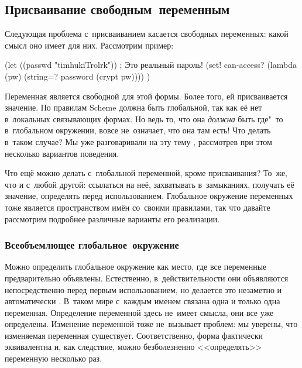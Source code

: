 \subsection{Присваивание свободным~переменным}%
\label{assignment/assignment/ssect:free-vars}

Следующая проблема с~присваиванием касается свободных переменных: какой смысл
оно имеет для них. Рассмотрим пример:

\begin{code:lisp}
(let ((passwd "timhukiTrolrk"))  ; Это реальный пароль!
  (set! can-access? (lambda (pw) (string=? password (crypt pw)))) )
\end{code:lisp}

Переменная  является свободной для этой формы. Более того, ей
присваивается значение. По правилам Scheme  должна быть
глобальной, так как её нет в~локальных связывающих формах. Но ведь то, что она
\emph{должна} быть где"~то в~глобальном окружении, вовсе не~означает, что она
там есть! Что делать в~таком случае? Мы уже разговаривали на эту тему
, рассмотрев при этом
несколько вариантов поведения.

Что ещё можно делать с~глобальной переменной, кроме присваивания? То~же, что и
с~любой другой: ссылаться на неё, захватывать в~замыканиях, получать её
значение, определять перед использованием. Глобальное окружение переменных тоже
является пространством имён со~своими правилами, так что давайте рассмотрим
подробнее различные варианты его реализации.


\subsubsection{Всеобъемлющее глобальное~окружение}%
\label{assignment/assignment/free-vars/sssect:universal}

Можно определить глобальное окружение как место, где все переменные
предварительно объявлены. Естественно, в~действительности они объявляются
непосредственно перед первым использованием, но делается это незаметно и
автоматически \cite{que95}. В~таком мире с~каждым именем связана одна и только
одна переменная. Определение переменной здесь не~имеет смысла, они все уже
определены. Изменение переменной тоже не~вызывает проблем: мы уверены, что
изменяемая переменная существует. Соответственно, форма  фактически
эквивалентна  и, как следствие, можно безболезненно <<определять>>
переменную несколько раз.

